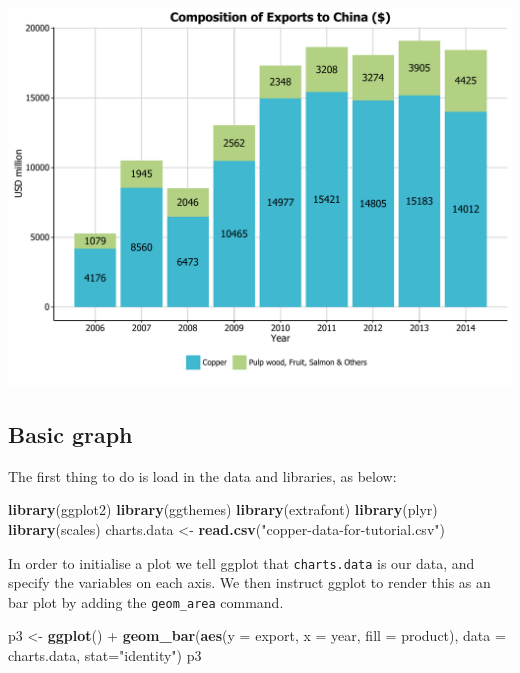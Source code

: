 \documentclass[]{article}
\newenvironment{Shaded}{\begin{snugshade}}{\end{snugshade}}
\newcommand{\KeywordTok}[1]{\textcolor[rgb]{0.13,0.29,0.53}{\textbf{{#1}}}}
\newcommand{\DataTypeTok}[1]{\textcolor[rgb]{0.13,0.29,0.53}{{#1}}}
\newcommand{\StringTok}[1]{\textcolor[rgb]{0.31,0.60,0.02}{{#1}}}
\newcommand{\NormalTok}[1]{{#1}}
\begin{document}
\begin{center}\includegraphics{0_all_posts_pdf/bar_final-1} \end{center}

\subsection{Basic graph}\label{basic-graph-2}

The first thing to do is load in the data and libraries, as below:

\begin{Shaded}
\begin{Highlighting}[]
\KeywordTok{library}\NormalTok{(ggplot2)}
\KeywordTok{library}\NormalTok{(ggthemes)}
\KeywordTok{library}\NormalTok{(extrafont)}
\KeywordTok{library}\NormalTok{(plyr)}
\KeywordTok{library}\NormalTok{(scales)}
\NormalTok{charts.data <-}\StringTok{ }\KeywordTok{read.csv}\NormalTok{(}\StringTok{"copper-data-for-tutorial.csv"}\NormalTok{)}
\end{Highlighting}
\end{Shaded}

In order to initialise a plot we tell ggplot that \texttt{charts.data}
is our data, and specify the variables on each axis. We then instruct
ggplot to render this as an bar plot by adding the \texttt{geom\_area}
command.

\begin{Shaded}
\begin{Highlighting}[]
\NormalTok{p3 <-}\StringTok{ }\KeywordTok{ggplot}\NormalTok{() +}\StringTok{ }\KeywordTok{geom_bar}\NormalTok{(}\KeywordTok{aes}\NormalTok{(}\DataTypeTok{y =} \NormalTok{export, }\DataTypeTok{x =} \NormalTok{year, }\DataTypeTok{fill =} \NormalTok{product), }\DataTypeTok{data =} \NormalTok{charts.data, }
                          \DataTypeTok{stat=}\StringTok{"identity"}\NormalTok{)}
\NormalTok{p3}
\end{Highlighting}
\end{Shaded}
\end{document}
